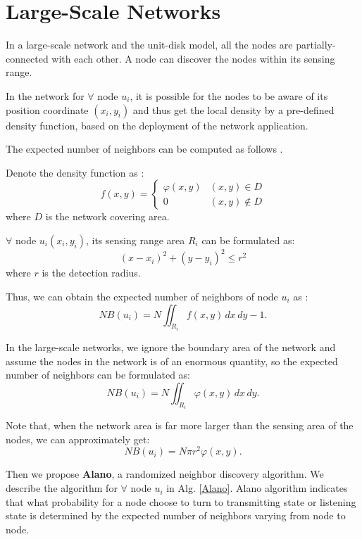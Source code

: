 \section{Large-Scale Networks}
\label{PCN}


In a large-scale network and the unit-disk model, 
all the nodes are partially-connected with each other.
A node can discover the nodes within its sensing 
range.

In the network for $\forall$ node $u_i$, 
it is possible for the nodes to  be aware of its position coordinate $(x_i,y_i)$ 
and thus get the local density by a pre-defined density function, based on 
the deployment of the network application.

The expected number of neighbors can be computed as 
follows \cite{meester1996continuum, wang2015connectivity}.

Denote the density function as :
$$f(x,y)=
\begin{cases}
\varphi(x,y)& (x,y)\in D\\
0& (x,y)\notin D
\end{cases}$$
where $D$ is the network covering area.

$\forall$ node $u_i (x_i,y_i)$, its sensing range area $R_i$ can be formulated as:
$$
(x-x_i)^2+(y-y_i)^2 \leq r^2
$$
where $r$ is the detection radius.

Thus, we can obtain the expected number of neighbors of node $u_i$ as :
$$
NB(u_i) = N\iint_{R_i} f(x,y)\,dx\,dy - 1.
$$

In the large-scale networks, we ignore the boundary area of the network and assume the
nodes in the network is of an enormous quantity, so the 
expected number of neighbors can be formulated as:
$$
NB(u_i) = N\iint_{R_i} \varphi(x,y)\,dx\,dy.
$$

Note that, when the network area is far more larger than the
sensing area of the nodes, we can approximately get:
$$
NB(u_i) = N\pi r^2 \varphi(x,y).
$$




Then we propose \textbf{Alano}, a randomized neighbor discovery algorithm. 
We describe the algorithm for $\forall$ node $u_i$ in Alg. \ref{Alano}.
Alano algorithm indicates that what probability for a node choose to turn to  
transmitting state or listening state is determined
by the expected number of neighbors varying from node to node.


